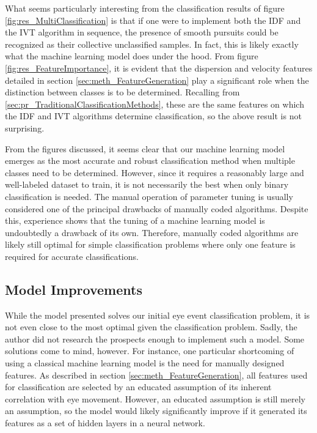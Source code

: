 What seems particularly interesting from the classification results of figure \ref{fig:res_MultiClassification} is that if one were to implement both the IDF and the IVT algorithm in sequence, the presence of smooth pursuits could be recognized as their collective unclassified samples. In fact, this is likely exactly what the machine learning model does under the hood. From figure \ref{fig:res_FeatureImportance}, it is evident that the dispersion and velocity features detailed in section \ref{sec:meth_FeatureGeneration} play a significant role when the distinction between classes is to be determined. Recalling from \ref{sec:pr_TraditionalClassificationMethods}, these are the same features on which the IDF and IVT algorithms determine classification, so the above result is not surprising. 

From the figures discussed, it seems clear that our machine learning model emerges as the most accurate and robust classification method when multiple classes need to be determined. However, since it requires a reasonably large and well-labeled dataset to train, it is not necessarily the best when only binary classification is needed. The manual operation of parameter tuning is usually considered one of the principal drawbacks of manually coded algorithms. Despite this, experience shows that the tuning of a machine learning model is undoubtedly a drawback of its own. Therefore, manually coded algorithms are likely still optimal for simple classification problems where only one feature is required for accurate classifications.

\subsection{Model Improvements}
While the model presented solves our initial eye event classification problem, it is not even close to the most optimal given the classification problem. Sadly, the author did not research the prospects enough to implement such a model. Some solutions come to mind, however. For instance, one particular shortcoming of using a classical machine learning model is the need for manually designed features. As described in section \ref{sec:meth_FeatureGeneration}, all features used for classification are selected by an educated assumption of its inherent correlation with eye movement. However, an educated assumption is still merely an assumption, so the model would likely significantly improve if it generated its features as a set of hidden layers in a neural network.


